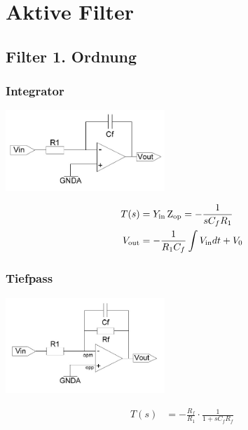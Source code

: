 \section{Aktive Filter}

\subsection{Filter 1. Ordnung}

\subsubsection{Integrator}
\begin{multicols}{2}
	\begin{center}
		\includegraphics[width=6cm]{images/filter_1_integrator.jpg}
	\end{center}
	\begin{align*}
		T(s) &= Y_{\operatorname{\text{in}}} \operatorname{Z_{\text{op}}} = - \frac{1}{s C_f R_1} \\
		V_{\operatorname{\text{out}}} &= -\frac{1}{R_1 C_f} \int V_{\operatorname{\text{in}}} dt + V_0
	\end{align*}
\end{multicols}

\subsubsection{Tiefpass}
\begin{multicols}{2}
	\begin{center}
		\includegraphics[width=6cm]{images/filter_1_tiefpass.jpg}
	\end{center}
	\begin{align*}
		T(s) &= -\frac{R_f}{R_1} \cdot \frac{1}{1 + s C_f R_f}
	\end{align*}
\end{multicols}

